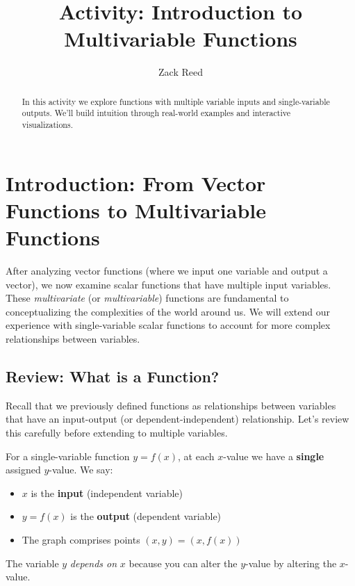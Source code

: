 \documentclass{ximera}
\title{Activity: Introduction to Multivariable Functions}
\author{Zack Reed}
\begin{document}
\begin{abstract}
In this activity we explore functions with multiple variable inputs and single-variable outputs. We'll build intuition through real-world examples and interactive visualizations.
\end{abstract}
\maketitle

\section*{Introduction: From Vector Functions to Multivariable Functions}

After analyzing vector functions (where we input one variable and output a vector), we now examine scalar functions that have multiple input variables. These \emph{multivariate} (or \emph{multivariable}) functions are fundamental to conceptualizing the complexities of the world around us. We will extend our experience with single-variable scalar functions to account for more complex relationships between variables.

\subsection*{Review: What is a Function?}

Recall that we previously defined functions as relationships between variables that have an input-output (or dependent-independent) relationship. Let's review this carefully before extending to multiple variables.

\begin{definition}
For a single-variable function $y = f(x)$, at each $x$-value we have a \textbf{single} assigned $y$-value. We say:
\begin{itemize}
    \item $x$ is the \textbf{input} (independent variable)
    \item $y = f(x)$ is the \textbf{output} (dependent variable)
    \item The graph comprises points $(x, y) = (x, f(x))$
\end{itemize}

The variable $y$ \emph{depends on} $x$ because you can alter the $y$-value by altering the $x$-value.
\end{definition}
\end{document}
